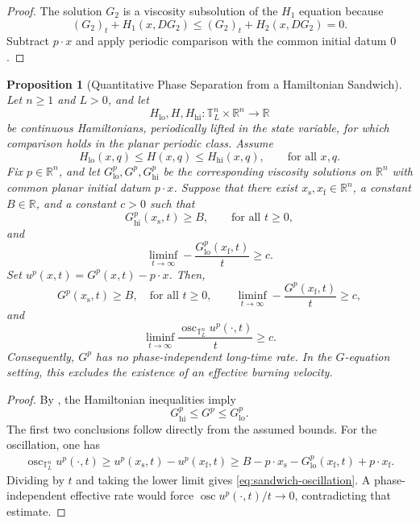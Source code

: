 \documentclass[11pt,reqno,noamsfonts]{amsart}
\newtheorem{proposition}[theorem]{Proposition}
\theoremstyle{definition}
\theoremstyle{remark}
\newcommand{\T}{\mathbb T}
\newcommand{\osc}{\operatorname{osc}}
\begin{document}
\begin{proof}
The solution $G_2$ is a viscosity subsolution of the $H_1$ equation because
\[
  (G_2)_t+H_1(x,DG_2)
  \le (G_2)_t+H_2(x,DG_2)=0.
\]
Subtract $p\cdot x$ and apply periodic comparison with the common initial datum $0$.
\end{proof}

\begin{proposition}[Quantitative Phase Separation from a Hamiltonian Sandwich]
\label{prop:phase-separation-sandwich}
Let $n\ge1$ and $L>0$, and let
\[
  H_{\mathrm{lo}},H,H_{\mathrm{hi}}:
  \T_L^n\times\mathbb R^n\to\mathbb R
\]
be continuous Hamiltonians, periodically lifted in the state variable,
for which comparison holds in the planar periodic class.  Assume
\[
  H_{\mathrm{lo}}(x,q)\le H(x,q)\le H_{\mathrm{hi}}(x,q),
  \qquad\text{for all }x,q.
\]
Fix $p\in\mathbb R^n$, and let
$G_{\mathrm{lo}}^p,G^p,G_{\mathrm{hi}}^p$ be the corresponding
viscosity solutions on $\mathbb R^n$ with common planar initial datum
$p\cdot x$.  Suppose that there exist
$x_{\mathrm s},x_{\mathrm f}\in\mathbb R^n$,
a constant $B\in\mathbb R$, and a constant $c>0$ such that
\[
  G_{\mathrm{hi}}^p(x_{\mathrm s},t)\ge B,
  \qquad\text{for all }t\ge0,
\]
and
\[
  \liminf_{t\to\infty}
  -\frac{G_{\mathrm{lo}}^p(x_{\mathrm f},t)}{t}
  \ge c.
\]
Set $u^p(x,t)=G^p(x,t)-p\cdot x$.  Then,
\[
  G^p(x_{\mathrm s},t)\ge B,
  \quad\text{for all }t\ge0,
  \qquad
  \liminf_{t\to\infty}
  -\frac{G^p(x_{\mathrm f},t)}{t}
  \ge c,
\]
and
\begin{equation}\label{eq:sandwich-oscillation}
  \liminf_{t\to\infty}
  \frac{\osc_{\T_L^n}u^p(\cdot,t)}{t}
  \ge c.
\end{equation}
Consequently, $G^p$ has no phase-independent long-time rate.  In the
$G$-equation setting, this excludes the existence of an effective
burning velocity.
\end{proposition}

\begin{proof}
By , the Hamiltonian inequalities imply
\[
  G_{\mathrm{hi}}^p\le G^p\le G_{\mathrm{lo}}^p.
\]
The first two conclusions follow directly from the assumed bounds.  For
the oscillation, one has
\begin{align*}
  \osc_{\T_L^n}u^p(\cdot,t)
  \ge u^p(x_{\mathrm s},t)-u^p(x_{\mathrm f},t)\ge B-p\cdot x_{\mathrm s}
       -G_{\mathrm{lo}}^p(x_{\mathrm f},t)
       +p\cdot x_{\mathrm f}.
\end{align*}
Dividing by $t$ and taking the lower limit gives
\eqref{eq:sandwich-oscillation}.  A phase-independent effective rate
would force $\osc u^p(\cdot,t)/t\to0$, contradicting that estimate.
\end{proof}
\end{document}
